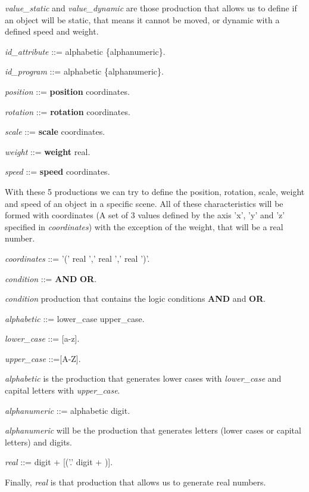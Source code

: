 \documentclass[12pt]{article}
\begin{document}
\textit{value\_static} and \textit{value\_dynamic} are those production that allows us to define if an object will be static, that means it cannot be moved, or dynamic with a defined speed and weight.

\noindent \textit{id\_attribute} ::= alphabetic \{alphanumeric\}.

\noindent \textit{id\_program} ::= alphabetic \{alphanumeric\}.

\noindent \textit{position} ::= \textbf{position} coordinates.

\noindent \textit{rotation} ::= \textbf{rotation} coordinates.

\noindent \textit{scale} ::=  \textbf{scale} coordinates.

\noindent \textit{weight} ::= \textbf{weight} real.

\noindent \textit{speed} ::= \textbf{speed} coordinates.

With these 5 productions we can try to define the position, rotation, scale, weight and speed of an object in a specific scene. All of these characteristics will be formed with coordinates (A set of 3 values defined by the axis 'x', 'y' and 'z' specified in \textit{coordinates}) with the exception of the weight, that will be a real number.

\noindent \textit{coordinates} ::= '(' real ',' real ','  real ')'.

\noindent \textit{condition} ::= \textbf{AND} \textbar \textbf{OR}.

\textit{condition} production that contains the logic conditions \textbf{AND} and \textbf{OR}.

\noindent \textit{alphabetic} ::= lower\_case  \textbar  upper\_case.

\noindent \textit{lower\_case} ::= [a-z].

\noindent \textit{upper\_case} ::=[A-Z].

\textit{alphabetic} is the production that generates lower cases with \textit{lower\_case} and capital letters with \textit{upper\_case}.

\noindent \textit{alphanumeric} ::= alphabetic \textbar digit.

\textit{alphanumeric} will be the production that generates letters (lower cases or capital letters) and digits.

\noindent \textit{real} ::= digit + [('.' digit + )].

Finally, \textit{real} is that production that allows us to generate real numbers.

\newpage


\end{document}
